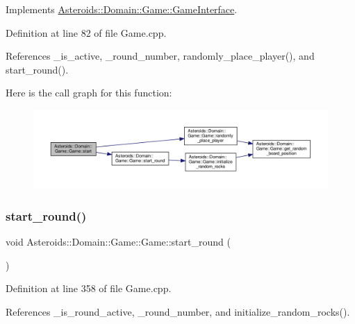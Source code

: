 Implements \hyperlink{classAsteroids_1_1Domain_1_1Game_1_1GameInterface_a9e11cc0884f1865033627d80e3c4078d}{Asteroids\+::\+Domain\+::\+Game\+::\+Game\+Interface}.



Definition at line 82 of file Game.\+cpp.



References \+\_\+is\+\_\+active, \+\_\+round\+\_\+number, randomly\+\_\+place\+\_\+player(), and start\+\_\+round().

Here is the call graph for this function\+:\nopagebreak
\begin{figure}[H]
\begin{center}
\leavevmode
\includegraphics[width=350pt]{classAsteroids_1_1Domain_1_1Game_1_1Game_a824018131c10d49c8addd305ff36209b_cgraph}
\end{center}
\end{figure}
\mbox{\label{classAsteroids_1_1Domain_1_1Game_1_1Game_aa242712e038fce29760d53eb1d57c9fb}} 
\subsubsection{\texorpdfstring{start\+\_\+round()}{start\_round()}}
{\footnotesize\ttfamily void Asteroids\+::\+Domain\+::\+Game\+::\+Game\+::start\+\_\+round (\begin{DoxyParamCaption}{ }\end{DoxyParamCaption})\hspace{0.3cm}{\ttfamily [private]}}



Definition at line 358 of file Game.\+cpp.



References \+\_\+is\+\_\+round\+\_\+active, \+\_\+round\+\_\+number, and initialize\+\_\+random\+\_\+rocks().



